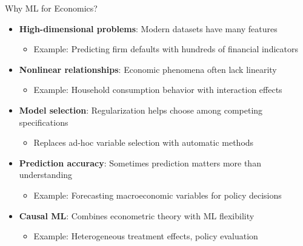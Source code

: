 \documentclass[11pt]{beamer}
\begin{document}
\begin{frame}[fragile]{Why ML for Economics?}
	\begin{itemize}
		\setlength{\itemsep}{0.3cm}
		\item \textbf{High-dimensional problems}: Modern datasets have many features
		      \begin{itemize}
			      \small
			      \item Example: Predicting firm defaults with hundreds of financial indicators
		      \end{itemize}
		\item \textbf{Nonlinear relationships}: Economic phenomena often lack linearity
		      \begin{itemize}
			      \small
			      \item Example: Household consumption behavior with interaction effects
		      \end{itemize}
		\item \textbf{Model selection}: Regularization helps choose among competing specifications
		      \begin{itemize}
			      \small
			      \item Replaces ad-hoc variable selection with automatic methods
		      \end{itemize}
		\item \textbf{Prediction accuracy}: Sometimes prediction matters more than understanding
		      \begin{itemize}
			      \small
			      \item Example: Forecasting macroeconomic variables for policy decisions
		      \end{itemize}
		\item \textbf{Causal ML}: Combines econometric theory with ML flexibility
		      \begin{itemize}
			      \small
			      \item Example: Heterogeneous treatment effects, policy evaluation
		      \end{itemize}
	\end{itemize}
\end{frame}
\end{document}
